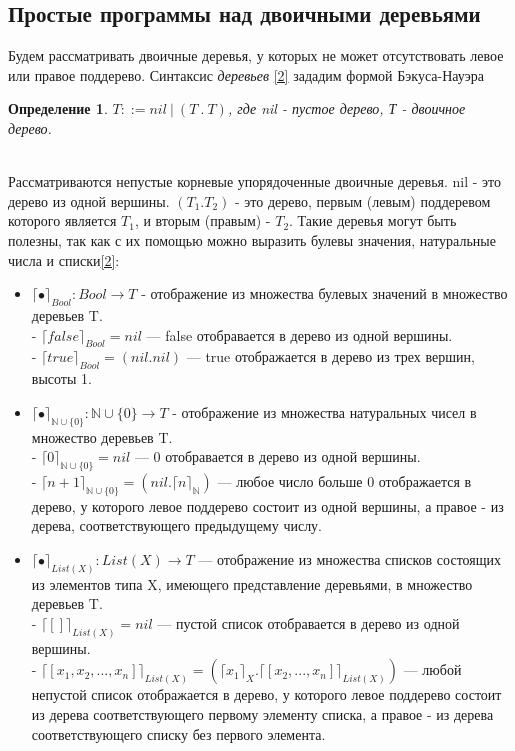 \documentclass[12pt]{article}
\newtheorem{defn}{Определение}[section]
\begin{document}
\subsection{Простые программы над двоичными деревьями}
Будем рассматривать двоичные деревья, у которых не может отсутствовать левое или правое поддерево. Синтаксис \emph{деревьев} \hyperlink{bibl2}{[2]} зададим формой Бэкуса-Науэра \\
\begin{defn} $T ::= nil \ | \ (T \ . \ T)$, где nil - пустое дерево, Т - двоичное дерево.\end{defn} \\
Рассматриваются непустые корневые упорядоченные двоичные деревья. nil - это дерево из одной вершины. $(T_{1}.T_{2})$ - это дерево, первым (левым) поддеревом которого является $T_{1}$, и вторым (правым) - $T_{2}$. Такие деревья могут быть полезны, так как с их помощью можно выразить булевы значения, натуральные числа и списки\hyperlink{bibl2}{[2]}:\\
\begin{itemize}
 \item $\lceil\bullet\rceil_{Bool} : Bool \rightarrow T$ -  отображение из множества булевых значений в множество деревьев T.\\
 		- $\lceil false\rceil_{Bool} = nil$ --- false отобравается в дерево из одной вершины.\\
 		- $\lceil true\rceil_{Bool} = (nil . nil)$ --- true отображается в дерево из трех вершин, высоты 1.\\
 \item $\lceil\bullet\rceil_{\mathbb{N} \cup \{0\}} : \mathbb{N} \cup \{0\}  \rightarrow T$ - отображение из множества натуральных чисел в множество деревьев T.\\
 		- $\lceil 0\rceil_{\mathbb{N} \cup \{0\}} = nil$ --- 0 отобравается в дерево из одной вершины.\\
 		- $\lceil n + 1\rceil_{\mathbb{N} \cup \{0\}} = (nil . \lceil n \rceil_{\mathbb{N}})$ --- любое число больше 0 отображается в дерево, у которого левое поддерево состоит из одной вершины, а правое - из дерева, соответствующего предыдущему числу. \\
 \item $\lceil\bullet\rceil_{List(X)} : List(X) \rightarrow T$ --- отображение из множества списков состоящих из элементов типа X, имеющего представление деревьями, в множество деревьев T.\\
 		- $\lceil []\rceil_{List(X)} = nil$ --- пустой список отобравается в дерево из одной вершины.\\
 		- $\lceil [x_{1}, x_{2}, ..., x_{n}]\rceil_{List(X)} = (\lceil x_{1} \rceil_{X} . \lceil [x_{2}, ..., x_{n}]\rceil_{List(X)})$ --- любой непустой список отображается в дерево, у которого левое поддерево состоит из дерева соответствующего первому элементу списка, а правое - из дерева соответствующего списку без первого элемента.
\end{itemize}\\
\end{document}
